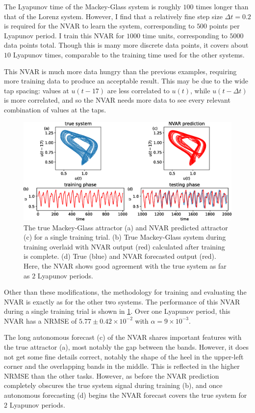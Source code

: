 The Lyapunov time of the Mackey-Glass system is roughly $100$ times
longer than that of the Lorenz system. However, I find that a
relatively fine step size $\Delta t = 0.2$ is required for the NVAR to
learn the system, corresponding to $500$ points per Lyapunov period. I train this NVAR for $1000$ time units,
corresponding to $5000$ data points total. Though this is many more
discrete data points, it covers about $10$ Lyapunov times, comparable
to the training time used for the other systems.

This NVAR is much more data hungry than the previous examples,
requiring more training data to produce an acceptable result. This may
be due to the wide tap spacing: values at $u(t - 17)$ are less
correlated to $u(t)$, while $u(t - \Delta t)$ is more correlated, and
so the NVAR needs more data to see every relevant combination of
values at the taps.

\begin{figure}
  \includegraphics[width=\textwidth]{figures/nvar-predict-mackey-glass}
  \caption{The true Mackey-Glass attractor (a) and NVAR predicted
    attractor (c) for a single training trial. (b) True Mackey-Glass
    system during training overlaid with NVAR output (red) calculated
    after training is complete. (d) True (blue) and NVAR forecasted
    output (red). Here, the NVAR shows good agreement with the true
    system as far as $2$ Lyapunov periods.}
  \label{fig:nvar-predict-mackey-glass}
\end{figure}

Other than these modifications, the methodology for training and
evaluating the NVAR is exactly as for the other two systems. The
performance of this NVAR during a single training trial is shown in
\cref{fig:nvar-predict-mackey-glass}. Over one Lyapunov period, this
NVAR has a NRMSE of $5.77\pm0.42\times10^{-2}$ with $\alpha =
9\times10^{-3}$.

The long autonomous forecast (c) of the NVAR shares important features
with the true attractor (a), most notably the gap between the
bands. However, it does not get some fine details correct, notably the
shape of the heel in the upper-left corner and the overlapping bands
in the middle. This is reflected in the higher NRMSE than the other
tasks. However, as before the NVAR prediction completely obscures the
true system signal during training (b), and once autonomous
forecasting (d) begins the NVAR forecast covers the true system for $2$
Lyapunov periods.


